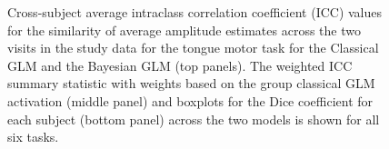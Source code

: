 \documentclass{article}
\begin{document}
\begin{figure}
\begin{tabularx}{\textwidth}{|X|X|}
	\end{tabularx}	
	\caption{Cross-subject average intraclass correlation coefficient (ICC) values for the similarity of average amplitude estimates across the two visits in the study data for the tongue motor task for the Classical GLM and the Bayesian GLM (top panels). The weighted ICC summary statistic with weights based on the group classical GLM activation (middle panel) and boxplots for the Dice coefficient for each subject (bottom panel) across the two models is shown for all six tasks.}
	\label{fig:icc}
\end{figure}
\end{document}
